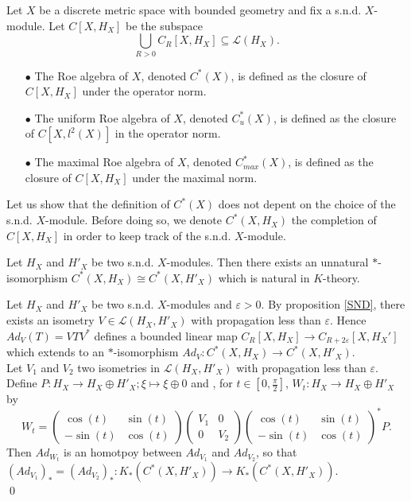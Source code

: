 \begin{definition}
Let $X$ be a discrete metric space with bounded geometry and fix a s.n.d. $X$-module. Let $C[X,H_X] $ be the subspace 
\[\bigcup_{R>0} C_R[X,H_X]\subseteq \mathcal L(H_X).\] 
\begin{itemize}
\item[$\bullet$] The Roe algebra of $X$, denoted $C^*(X)$, is defined as the closure of $C[X,H_X]$ under the operator norm.
\item[$\bullet$] The uniform Roe algebra of $X$, denoted $C_u^*(X)$, is defined as the closure of $C[X,l^2(X)]$ in the operator norm.
\item[$\bullet$] The maximal Roe algebra of $X$, denoted $C_{max}^*(X)$, is defined as the closure of $C[X,H_X]$ under the maximal norm. 
\end{itemize}
\end{definition}

Let us show that the definition of $C^*(X)$ does not depent on the choice of the s.n.d. $X$-module. Before doing so, we denote $C^*(X,H_X)$ the completion of $C[X,H_X]$ in order to keep track of the s.n.d. $X$-module.

\begin{prop}
Let $H_X$ and $H'_X$ be two s.n.d. $X$-modules. Then there exists an unnatural $*$-isomorphism $C^*(X,H_X)\cong C^*(X,H'_X)$ which is natural in $K$-theory.
\end{prop}
\begin{dem}
Let $H_X$ and $H'_X$ be two s.n.d. $X$-modules and $\varepsilon>0$. By proposition \ref{SND}, there exists an isometry $V\in\mathcal L(H_X,H'_X)$ with propagation less than $\varepsilon$. Hence $Ad_V(T) = V T V^*$ defines a bounded linear map $C_R[X,H_X]\rightarrow C_{R+2\varepsilon}[X,H_X']$ which extends to an $*$-isomorphism $Ad_V : C^*(X,H_X)\rightarrow C^*(X,H'_X)$.\\

Let $V_1$ and $V_2$ two isometries in $\mathcal L(H_X,H'_X)$ with propagation less than $\varepsilon$. Define $P : H_X\rightarrow H_X\oplus H'_X ; \xi \mapsto \xi \oplus 0$ and , for $t\in [0,\frac{\pi}{2}]$, $W_t : H_X \rightarrow H_X\oplus H'_X$ by 
\[W_t = 
\begin{pmatrix} \cos(t) & \sin (t)\\ -\sin (t) & \cos (t)\end{pmatrix}
\begin{pmatrix} V_1 & 0 \\ 0 & V_2 \end{pmatrix}
\begin{pmatrix} \cos(t) & \sin (t)\\ -\sin (t) & \cos (t)\end{pmatrix}^* P.\] 
Then $Ad_{W_t}$ is an homotpoy between $Ad_{V_1}$ and $Ad_{V_2}$, so that $(Ad_{V_1})_* = (Ad_{V_2})_* : K_*(C^*(X,H'_X))\rightarrow K_*(C^*(X,H'_X))$.\\
\qed
\end{dem}

